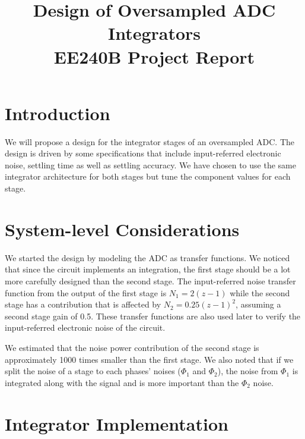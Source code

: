 \documentclass[conference]{IEEEtran}
\begin{document}
\title{Design of Oversampled ADC Integrators \\ \Large EE240B Project Report}
\author{
\and
{}
}
\maketitle

\section{Introduction}

We will propose a design for the integrator stages of an oversampled ADC. The design is driven by some specifications that include input-referred electronic noise, settling time as well as settling accuracy. We have chosen to use the same integrator architecture for both stages but tune the component values for each stage.


\section{System-level Considerations}

We started the design by modeling the ADC as transfer functions. We noticed that since the circuit implements an integration, the first stage should be a lot more carefully designed than the second stage. The input-referred noise transfer function from the output of the first stage is $N_1 = 2(z-1)$ while the second stage has a contribution that is affected by $N_2 = 0.25(z-1)^2$, assuming a second stage gain of 0.5. These transfer functions are also used later to verify the input-referred electronic noise of the circuit.

We estimated that the noise power contribution of the second stage is approximately 1000 times smaller than the first stage. We also noted that if we split the noise of a stage to each phases' noises ($\Phi_1$ and $\Phi_2$), the noise from $\Phi_1$ is integrated along with the signal and is more important than the $\Phi_2$ noise. 

\section{Integrator Implementation}
\end{document}
